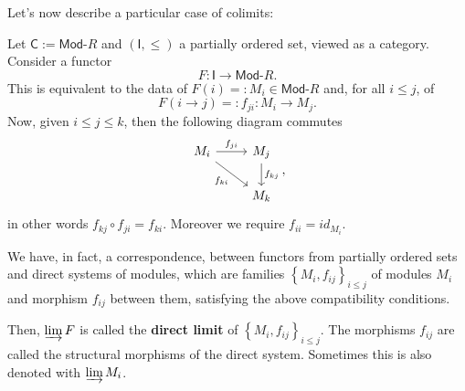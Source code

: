 Let's now describe a particular case of colimits:
\begin{ex}
	Let $\mathsf{C} := \mathsf{Mod}\text{-}R$ and $\left( \mathsf{I}, \leq \right)$ a partially ordered set, viewed as a category.
	Consider a functor
	\begin{equation}
	F: \mathsf{I} \to \mathsf{Mod}\text{-}R
	.\end{equation} 
	This is equivalent to the data of $F(i) =: M_i \in \mathsf{Mod}\text{-}R$ and, for all $i \leq j$, of
	\begin{equation}
		F(i \to j) =: f_{ji}: M_i \to M_j
	.\end{equation} 
	Now, given $i \leq j \leq k$, then the following diagram commutes
	\begin{equation}
	\begin{tikzcd}
		M_i \arrow[r, "f_{ji}", rightarrow] \arrow[rd, "f_{ki}"', rightarrow] &
		M_j \arrow[d, "f_{kj}", rightarrow] \\
		&
		M_k
	\end{tikzcd}
	,\end{equation} 
	in other words $f_{kj} \circ f_{ji} = f_{ki}$. Moreover we require $f_{ii} = id_{M_i}$.

	We have, in fact, a correspondence, between functors from partially ordered sets and
	direct systems of modules, which are families $\left\{ M_i, f_{ij} \right\}_{i \leq j}$ of modules $M_i$ and morphism $f_{ij}$ between them, satisfying the above compatibility conditions.

	Then, $\varinjlim F$ is called the \textbf{direct limit} of $\left\{ M_i, f_{ij} \right\}_{i \leq j}$.
	The morphisms $f_{ij}$ are called the structural morphisms of the direct system.
	Sometimes this is also denoted with $\varinjlim M_i$.
	

\end{ex}
